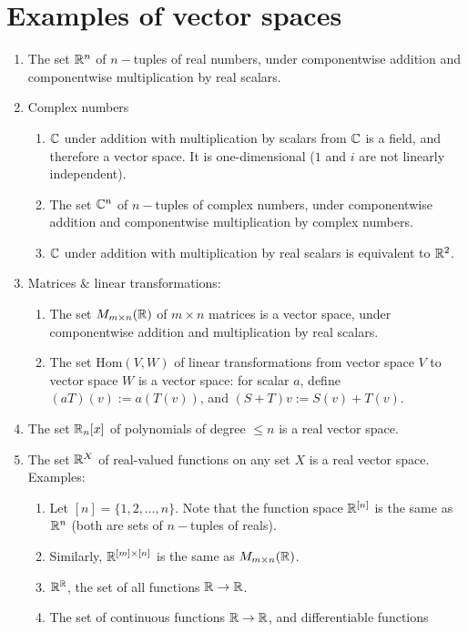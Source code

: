 \section{Examples of vector spaces}
\begin{enumerate}
\item The set $\mathbb{R}^n$ of $n-$tuples of real numbers, under componentwise addition and componentwise
  multiplication by real scalars.
\item Complex numbers
  \begin{enumerate}
  \item $\mathbb{C}$ under addition with multiplication by scalars from $\mathbb{C}$ is a field, and therefore a
    vector space. It is one-dimensional ($1$ and $i$ are not linearly independent).
  \item The set $\mathbb{C}^n$ of $n-$tuples of complex numbers, under componentwise addition and
    componentwise multiplication by complex numbers.
  \item $\mathbb{C}$ under addition with multiplication by real scalars is equivalent to $\mathbb{R}^2$.
  \end{enumerate}
\item Matrices \& linear transformations:
  \begin{enumerate}
  \item The set $M_{m \times n}(\mathbb{R})$ of $m\times n$ matrices is a vector space, under componentwise
    addition and multiplication by real scalars.
  \item The set $\mathrm{Hom}(V, W)$ of linear transformations from vector space $V$ to vector
    space $W$ is a vector space: for scalar $a$, define $(aT)(v) := a(T(v))$, and
    $(S + T)v := S(v) + T(v)$.
  \end{enumerate}
\item The set $\mathbb{R}_n[x]$ of polynomials of degree $\leq n$ is a real vector
  space.
\item The set $\mathbb{R}^X$ of real-valued functions on any set $X$ is a real vector
  space. Examples:
  \begin{enumerate}
  \item Let $[n] = \{1, 2, \ldots, n\}$. Note that the function space $\mathbb{R}^{[n]}$ is
    the same as $\mathbb{R}^n$ (both are sets of $n-$tuples of reals).
  \item Similarly, $\mathbb{R}^{[m]\times[n]}$ is the same as $M_{m \times n}(\mathbb{R})$.
  \item $\mathbb{R}^{\mathbb{R}}$, the set of all functions $\mathbb{R}\to\mathbb{R}$.
  \item The set of continuous functions $\mathbb{R} \to \mathbb{R}$, and differentiable functions

\end{enumerate}
\end{enumerate}

